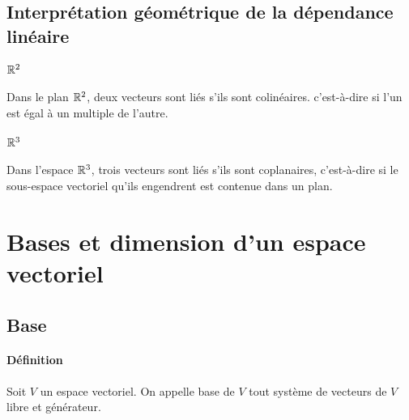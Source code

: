 \subsection{Interprétation géométrique de la dépendance linéaire}
\paragraph{$\mathbb{R}^2$} Dans le plan $\mathbb{R}^2$, deux vecteurs sont liés s'ils sont colinéaires. c'est-à-dire si l'un est égal à un multiple de l'autre. \\
\paragraph{$\mathbb{R}^3$} Dans l'espace $\mathbb{R}^3$, trois vecteurs sont liés s'ils sont coplanaires, c'est-à-dire si le sous-espace vectoriel qu'ils engendrent est contenue dans un plan.

%
%
\section{Bases et dimension d'un espace vectoriel}
%
%

%
\subsection{Base}
%
\paragraph{Définition} Soit $V$ un espace vectoriel. On appelle base de $V$ tout système de vecteurs de $V$ libre et générateur.

